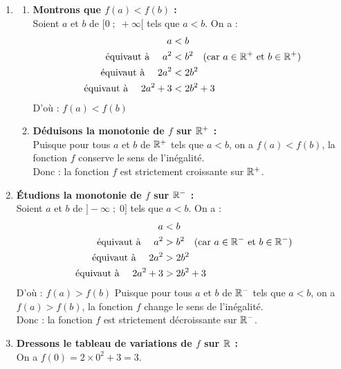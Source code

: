 \documentclass[10pt, a4paper]{article}
\begin{document}
\begin{Solution}[APPLICATION][8]
\begin{enumerate}[leftmargin=*,itemsep=0.5pt]
    \item 
    \begin{enumerate}[leftmargin=*,itemsep=0.5pt]
        \item \textbf{Montrons que $f(a) < f(b)$ :} \\
        Soient $a$ et $b$ de $\big[0 \;;\; +\infty\big[$ tels que $a < b$.
        On a :
        \begin{align*}
            a &< b \\
            \text{ équivaut à } \quad a^2 &< b^2 \quad \text{(car $a \in \mathbb{R}^+$ et $b \in \mathbb{R}^+$)} \\
            \text{ équivaut à } \quad 2a^2 &< 2b^2 \\
            \text{ équivaut à } \quad 2a^2 + 3 &< 2b^2 + 3
        \end{align*}
        D'où : \quad $f(a) < f(b)$ 

        \item \textbf{Déduisons la monotonie de $f$ sur $\mathbb{R}^+$ :} \\
        Puisque pour tous $a$ et $b$ de $\mathbb{R}^+$ tels que $a < b$, on a $f(a) < f(b)$, la fonction $f$ conserve le sens de l'inégalité. \\
        Donc : \quad la fonction $f$ est strictement croissante sur $\mathbb{R}^+$.
    \end{enumerate}

    \item \textbf{Étudions la monotonie de $f$ sur $\mathbb{R}^-$ :} \\
    Soient $a$ et $b$ de $\big]-\infty \;;\; 0\big]$ tels que $a < b$.
    On a :
    \begin{align*}
        a &< b \\
        \text{ équivaut à } \quad a^2 &> b^2 \quad \text{(car $a \in \mathbb{R}^-$ et $b \in \mathbb{R}^-$)} \\
        \text{ équivaut à } \quad 2a^2 &> 2b^2 \\
        \text{ équivaut à } \quad 2a^2 + 3 &> 2b^2 + 3
    \end{align*}
    D'où : \quad $f(a) > f(b) $
    Puisque pour tous $a$ et $b$ de $\mathbb{R}^-$ tels que $a < b$, on a $f(a) > f(b)$, la fonction $f$ change le sens de l'inégalité. \\
    Donc : \quad la fonction $f$ est strictement décroissante sur $\mathbb{R}^-$.

    \item \textbf{Dressons le tableau de variations de $f$ sur $\mathbb{R}$ :} \\
    On a $f(0) = 2 \times 0^2 + 3 = 3$.

\begin{center}
\end{center}
    
\end{enumerate}
\end{Solution}
\end{document}
